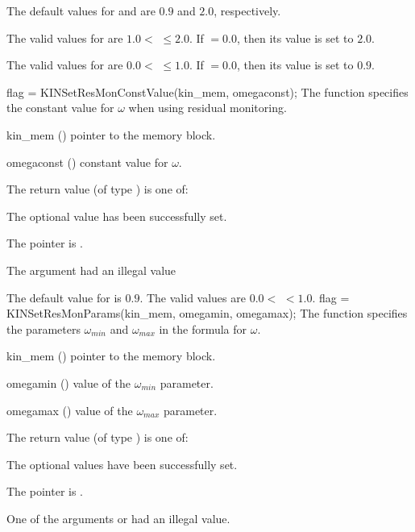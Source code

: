{
  The default values for  and  are $0.9$ and $2.0$, respectively.

  The valid values for  are $1.0<$  $\le 2.0$. 
  If  $= 0.0$, then its value is set to $2.0$.

  The valid values for  are $0.0 <$  $\le1.0$.
  If  $= 0.0$, then its value is set to $0.9$.
}
{
flag = KINSetResMonConstValue(kin\_mem, omegaconst);
}
{
  The function  specifies the constant value
  for $\omega$ when using residual monitoring.
}
{
  \begin{args}
  \item[kin\_mem] ()
    pointer to the {\kinsol} memory block.
  \item[omegaconst] ()
    constant value for $\omega$.
  \end{args}
}
{
  The return value  (of type ) is one of:
  \begin{args}
  \item[\Id{KIN\_SUCCESS}] 
    The optional value has been successfully set.
  \item[\Id{KIN\_MEM\_NULL}]
    The  pointer is .
  \item[\Id{KIN\_ILL\_INPUT}]
    The argument  had an illegal value
  \end{args}
}
{
  The default value for  is $0.9$.
  The valid values are $0.0 <$  $< 1.0$.
}
{
flag = KINSetResMonParams(kin\_mem, omegamin, omegamax);
}
{
  The function  specifies the parameters $\omega_{min}$ and
  $\omega_{max}$ in the formula for $\omega$.
}
{
  \begin{args}
  \item[kin\_mem] ()
    pointer to the {\kinsol} memory block.
  \item[omegamin] ()
    value of the $\omega_{min}$ parameter.
  \item[omegamax] ()
    value of the $\omega_{max}$ parameter.
  \end{args}
}
{
  The return value  (of type ) is one of:
  \begin{args}
  \item[\Id{KIN\_SUCCESS}] 
    The optional values have been successfully set.
  \item[\Id{KIN\_MEM\_NULL}]
    The  pointer is .
  \item[\Id{KIN\_ILL\_INPUT}]
    One of the arguments  or  had an illegal value.
  \end{args}
}
